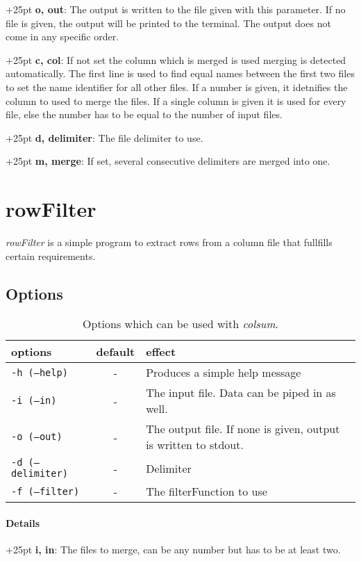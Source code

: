\documentclass[a4paper,10pt,parskip=half]{scrreprt}
\begin{document}
\hangindent+25pt 
\textbf{o, out}: The output is written to the file given with this parameter. If
no file is given, the output will be printed to the terminal. The output does
not come in any specific order.

\hangindent+25pt 
\textbf{c, col}: If not set the column which is merged is used merging is
detected automatically. The first line is used to find equal names between the
first two files to set the name identifier for all other files. 
If a number is given, it idetnifies the column to used to merge the files. If a single column is given it is used for every file, else the number has to be equal to the number of input files.

\hangindent+25pt 
\textbf{d, delimiter}: The file delimiter to use. 

\hangindent+25pt 
\textbf{m, merge}: If set, several consecutive delimiters are merged into one.



\chapter{rowFilter}


\textit{rowFilter} is a simple program to extract rows from a column file that fullfills certain requirements.

\section{Options}
\begin{table}[h]
\caption{Options which can be used with \textit{colsum}.}
\begin{tabular}{lcp{7cm}}\hline
options& default & effect \\\hline
 \texttt{-h (--help)}&- & Produces a simple help message\\
 \texttt{-i (--in)} &-& The input file. Data can be piped in as well.\\
 \texttt{-o (--out)} &-& The output file. If none is given, output is written to stdout.\\
 \texttt{-d (--delimiter)} &-& Delimiter\\
 \texttt{-f (--filter)} &-& The filterFunction to use\\
\end{tabular}
\end{table}

\subsubsection{Details}
\hangindent+25pt 
\textbf{i, in}: The files to merge, can be any number but has to be at least
two.
\end{document}
